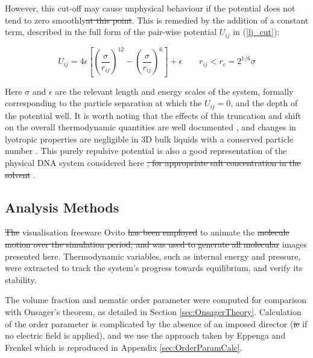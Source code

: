 \documentclass[11pt, a4paper]{article} %
\providecommand{\DIFadd}[1]{{\protect\color{blue}\uwave{#1}}} %
\providecommand{\DIFdel}[1]{{\protect\color{red}\sout{#1}}}                      %
\providecommand{\DIFaddbegin}{} %
\providecommand{\DIFaddend}{} %
\providecommand{\DIFdelbegin}{} %
\providecommand{\DIFdelend}{} %
\begin{document}
However, this cut-off may cause unphysical behaviour if the potential does not tend to zero smoothly\DIFdelbegin \DIFdel{at this point}\DIFdelend . This is remedied by the addition of a constant term, described in the full form of the pair-wise potential $U_{ij}$ in (\ref{lj_cut}):

\begin{equation} \label{lj_cut}
U_{ij} = 4\epsilon \left[ \left( \frac{\sigma}{r_{ij}} \right) ^{12} - \left( \frac{\sigma}{r_{ij}} \right) ^{6}	\right] + \epsilon \qquad	 r_{ij} < r_{c} = 2^{1/6} \sigma
\end{equation}

Here $\sigma$ and $\epsilon$ are the relevant length and energy scales of the system, formally corresponding to the particle separation at which the $U_{ij} = 0$, and the depth of the potential well. It is worth noting that the effects of this truncation and shift on the overall thermodynamic quantities are well documented \cite{Stephan2020, Shaul2010}, and changes in lyotropic properties are negligible in 3D bulk liquids with a conserved particle number \cite{Smit1991}. This purely repulsive potential is also a good representation of the physical DNA system considered here \DIFdelbegin \DIFdel{, for appropriate salt concentration in the solvent }\DIFdelend \cite{Strey1997, Strey1998}.

 
\subsection{Analysis Methods}
\DIFdelbegin \DIFdel{The }\DIFdelend \DIFaddbegin \DIFadd{\textcolor{forestgreen}{We employed} the }\DIFaddend visualisation freeware Ovito \cite{Ovito} \DIFdelbegin \DIFdel{has been employed }\DIFdelend to animate the \DIFdelbegin \DIFdel{molecule motion over the simulation period, and was used to generate all molecular }\DIFdelend \DIFaddbegin \DIFadd{\textcolor{forestgreen}{mesogens motion, and was used to generate all particle} }\DIFaddend images presented here. Thermodynamic variables, such as internal energy and pressure, were extracted to track the system's progress towards equilibrium, and verify its stability.

The volume fraction and nematic order parameter were computed for comparison with Onsager's theorem, as detailed in Section \ref{sec:OnsagerTheory}. Calculation of the order parameter is complicated by the absence of an imposed director (\DIFdelbegin \DIFdel{ie }\DIFdelend \DIFaddbegin \DIFadd{\textcolor{forestgreen}{i.e.} }\DIFaddend if no electric field is applied), and we use the approach taken by Eppenga and Frenkel \cite{Eppenga1984} which is reproduced in Appendix \ref{sec:OrderParamCalc}. %
\end{document}

